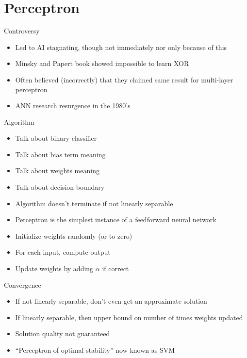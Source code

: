 




\section{Perceptron}

Controversy
\begin{itemize}
\item Led to AI stagnating, though not immediately nor only because of this
\item Minsky and Papert book showed impossible to learn XOR
\item Often believed (incorrectly) that they claimed same result for multi-layer perceptron
\item ANN research resurgence in the 1980's
\end{itemize}

Algorithm
\begin{itemize}
\item Talk about binary classifier
\item Talk about bias term meaning
\item Talk about weights meaning
\item Talk about decision boundary
  \vspace{2mm}
\item Algorithm doesn't terminate if not linearly separable
\item Perceptron is the simplest instance of a feedforward neural network
  \vspace{2mm}
\item Initialize weights randomly (or to zero)
\item For each input, compute output
\item Update weights by adding $\alpha$ if correct
\end{itemize}

Convergence
\begin{itemize}
\item If not linearly separable, don't even get an approximate solution
\item If linearly separable, then upper bound on number of times weights updated
\item Solution quality not guaranteed
\item ``Perceptron of optimal stability'' now known as SVM
\end{itemize}


